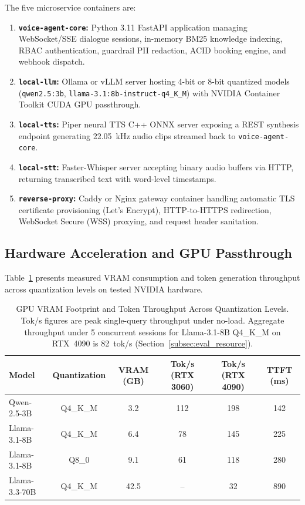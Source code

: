 \documentclass[11pt,a4paper]{article}
\begin{document}
The five microservice containers are:
\begin{enumerate}[leftmargin=*]
    \item \textbf{\texttt{voice-agent-core}:} Python 3.11 FastAPI application managing WebSocket/SSE dialogue sessions, in-memory BM25 knowledge indexing, RBAC authentication, guardrail PII redaction, ACID booking engine, and webhook dispatch.
    \item \textbf{\texttt{local-llm}:} Ollama or vLLM server hosting 4-bit or 8-bit quantized models (\texttt{qwen2.5:3b}, \texttt{llama-3.1:8b-instruct-q4\_K\_M}) with NVIDIA Container Toolkit CUDA GPU passthrough.
    \item \textbf{\texttt{local-tts}:} Piper neural TTS C++ ONNX server exposing a REST synthesis endpoint generating 22.05~kHz audio clips streamed back to \texttt{voice-agent-core}.
    \item \textbf{\texttt{local-stt}:} Faster-Whisper server accepting binary audio buffers via HTTP, returning transcribed text with word-level timestamps.
    \item \textbf{\texttt{reverse-proxy}:} Caddy or Nginx gateway container handling automatic TLS certificate provisioning (Let's Encrypt), HTTP-to-HTTPS redirection, WebSocket Secure (WSS) proxying, and request header sanitation.
\end{enumerate}

\subsection{Hardware Acceleration and GPU Passthrough}
\label{subsec:docker_gpu}

Table~\ref{tab:gpu_footprint} presents measured VRAM consumption and token generation throughput across quantization levels on tested NVIDIA hardware.

\begin{table}[htbp]
\centering
\small
\caption{GPU VRAM Footprint and Token Throughput Across Quantization Levels. Tok/s figures are peak single-query throughput under no-load. Aggregate throughput under 5 concurrent sessions for Llama-3.1-8B Q4\_K\_M on RTX~4090 is 82~tok/s (Section~\ref{subsec:eval_resource}).}
\label{tab:gpu_footprint}
\renewcommand{\arraystretch}{1.25}
\begin{tabularx}{\textwidth}{lccccc}
\toprule
\textbf{Model} & \textbf{Quantization} & \textbf{VRAM (GB)} & \textbf{Tok/s (RTX 3060)} & \textbf{Tok/s (RTX 4090)} & \textbf{TTFT (ms)} \\
\midrule
Qwen-2.5-3B & Q4\_K\_M & 3.2 & 112 & 198 & 142 \\
Llama-3.1-8B & Q4\_K\_M & 6.4 & 78 & 145 & 225 \\
Llama-3.1-8B & Q8\_0 & 9.1 & 61 & 118 & 280 \\
Llama-3.3-70B & Q4\_K\_M & 42.5 & -- & 32 & 890 \\
\bottomrule
\end{tabularx}
\end{table}
\end{document}
